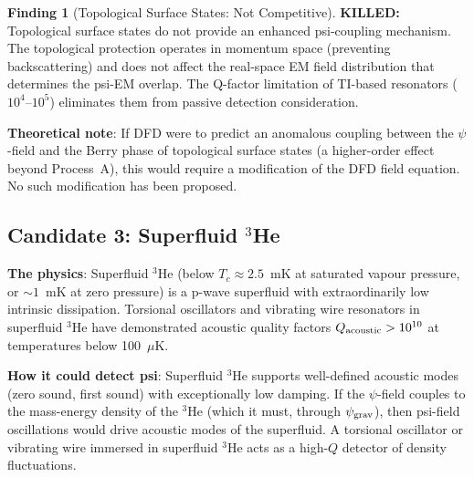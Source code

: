 \documentclass[11pt]{article}
\theoremstyle{definition}
\newtheorem{finding}[theorem]{Finding}
\theoremstyle{remark}
\newcommand{\psigrav}{\psi_{\rm grav}}
\newcommand{\killed}[1]{\textcolor{red!70!black}{\textbf{KILLED:} #1}}
\begin{document}
\begin{finding}[Topological Surface States: Not Competitive]
\label{find:topological}
\killed{Topological surface states do not provide an enhanced
psi-coupling mechanism.} The topological protection operates in
momentum space (preventing backscattering) and does not affect the
real-space EM field distribution that determines the psi-EM overlap.
The Q-factor limitation of TI-based resonators ($10^4$--$10^5$)
eliminates them from passive detection consideration.

\textbf{Theoretical note}: If DFD were to predict an anomalous coupling
between the $\psi$-field and the Berry phase of topological surface
states (a higher-order effect beyond Process~A), this would require
a modification of the DFD field equation. No such modification has
been proposed.
\end{finding}

\subsection{Candidate 3: Superfluid $^3$He}
\label{sec:he3}

\textbf{The physics}: Superfluid $^3$He (below $T_c \approx 2.5$~mK at
saturated vapour pressure, or $\sim 1$~mK at zero pressure) is a
p-wave superfluid with extraordinarily low intrinsic dissipation.
Torsional oscillators and vibrating wire resonators in superfluid $^3$He
have demonstrated acoustic quality factors $Q_{\rm acoustic} > 10^{10}$
at temperatures below 100~$\mu$K.

\textbf{How it could detect psi}: Superfluid $^3$He supports
well-defined acoustic modes (zero sound, first sound) with exceptionally
low damping. If the $\psi$-field couples to the mass-energy density of
the $^3$He (which it must, through $\psigrav$), then psi-field
oscillations would drive acoustic modes of the superfluid. A
torsional oscillator or vibrating wire immersed in superfluid $^3$He
acts as a high-$Q$ detector of density fluctuations.
\end{document}
